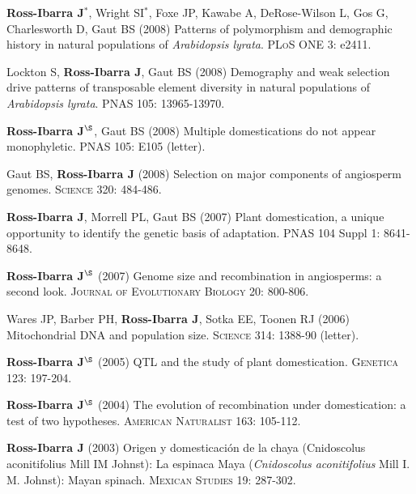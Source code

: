 \documentclass[letterpaper,10pt]{article}
\begin{document}
\begin{etaremune}
\item {\bf Ross-Ibarra J}$^*$, Wright SI$^*$, Foxe JP, Kawabe A, DeRose-Wilson L, Gos G, Charlesworth D, Gaut BS (2008) Patterns of polymorphism and demographic history in natural populations of \emph{Arabidopsis lyrata}.  \textsc{PLoS ONE} 3: e2411.


\item Lockton S, {\bf Ross-Ibarra J}, Gaut BS (2008) Demography and weak selection drive patterns of transposable element diversity in natural populations of \emph{Arabidopsis lyrata}. PNAS 105: 13965-13970.


\item {\bf Ross-Ibarra J}$^\S$, Gaut BS (2008) Multiple domestications do not appear monophyletic. PNAS 105: E105 (letter).


\item Gaut BS, {\bf Ross-Ibarra J} (2008) Selection on major components of angiosperm genomes.  \textsc{Science} 320: 484-486.


\item {\bf Ross-Ibarra J}, Morrell PL, Gaut BS (2007) Plant domestication, a unique opportunity to identify the genetic basis of adaptation. PNAS 104 Suppl 1: 8641-8648.


\item {\bf Ross-Ibarra J}$^\S$ (2007) Genome size and recombination in angiosperms: a second look.  \textsc{Journal of Evolutionary Biology} 20: 800-806.


\item Wares JP, Barber PH, {\bf Ross-Ibarra J}, Sotka EE, Toonen RJ (2006) Mitochondrial DNA and population size.  \textsc{Science} 314: 1388-90 (letter).


\item {\bf Ross-Ibarra J}$^\S$ (2005) QTL and the study of plant domestication.  \textsc{Genetica} 123: 197-204.


\item {\bf Ross-Ibarra J}$^\S$ (2004) The evolution of recombination under domestication: a test of two hypotheses.  \textsc{American Naturalist} 163: 105-112.


\item {\bf Ross-Ibarra J} (2003) Origen y domesticaci\'on de la chaya (Cnidoscolus aconitifolius Mill IM Johnst): La espinaca Maya (\emph{Cnidoscolus aconitifolius} Mill I. M. Johnst): Mayan spinach.  \textsc{Mexican Studies} 19: 287-302.


\end{etaremune}
\end{document}
